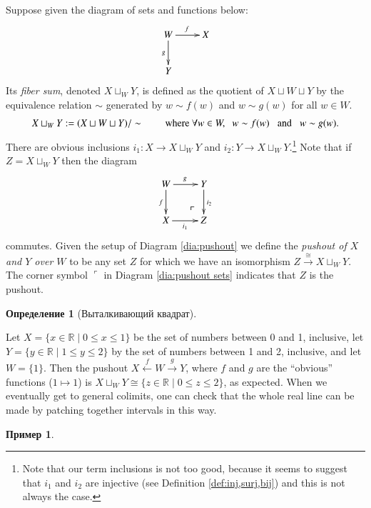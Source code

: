 \documentclass[a4paper]{book}
\makeatletter
\def\tn{\textnormal}
\def\RR{{\mathbb R}}
\def\hsp{\hspace{.3in}}
\def\to{\rightarrow}
\def\taking{\colon}
\def\iso{\cong}
\def\|{{\;|\;}}
\def\lrlimit{\ar@{}[lu]|(.3)*+{\ulcorner}}
\newcommand{\To}[1]{\xrightarrow{#1}}
\newcommand{\From}[1]{\xleftarrow{#1}}
\theoremstyle{myth}
\newtheorem{exampleENG}[envENG]{\begin{english}Example\end{english}}
\newtheorem{definitionENG}[envENG]{\begin{english}Definition\end{english}}
\newtheorem{exampleRUS}[envRUS]{Пример}
\newtheorem{definitionRUS}[envRUS]{Определение}
\makeatother
\begin{document}
\begin{russian}
\begin{definitionENG}[Pushout]\label{def:pushout}
Suppose given the diagram of sets and functions below:
\begin{align}\label{dia:pushout}
\xymatrix{W\ar[r]^f\ar[d]_g&X\\Y}
\end{align}
Its {\em fiber sum}, denoted $X\sqcup_WY$, is defined as the quotient of $X\sqcup W\sqcup Y$ by the equivalence relation $\sim$ generated by $w\sim f(w)$ and $w\sim g(w)$ for all $w\in W$.
$$X\sqcup_WY:=(X\sqcup W\sqcup Y)/\sim \hsp\tn{where } \forall w\in W,\;\;  w\sim f(w)\;\;\tn{ and }\;\; w\sim g(w).$$ 
There are obvious inclusions $i_1\taking X\to X\sqcup_WY$ and $i_2\taking Y\to X\sqcup_WY$.\footnote{Note that our term inclusions is not too good, because it seems to suggest that $i_1$ and $i_2$ are injective (see Definition \ref{def:inj,surj,bij}) and this is not always the case.}
Note that if $Z=X\sqcup_WY$ then the diagram
\begin{align}\label{dia:pushout sets}
\xymatrix{W\ar[r]^g\ar[d]_f&Y\ar[d]^{i_2}\\X\ar[r]_-{i_1}&Z\lrlimit}
\end{align} 
commutes. Given the setup of Diagram \ref{dia:pushout} we define the {\em pushout of $X$ and $Y$ over $W$} to be any set $Z$ for which we have an isomorphism $Z\To{\iso}X\sqcup_WY$. The corner symbol $\ulcorner$ in Diagram \ref{dia:pushout sets} indicates that $Z$ is the pushout.
\end{definitionENG}

\begin{definitionRUS}[Выталкивающий квадрат]\label{def:pushout}
 
\end{definitionRUS}

\begin{exampleENG}
Let $X=\{x\in\RR\|0\leq x\leq1\}$ be the set of numbers between 0 and 1, inclusive, let $Y=\{y\in\RR\|1\leq y\leq 2\}$ by the set of numbers between 1 and 2, inclusive, and let $W=\{1\}$. Then the pushout $X\From{f} W\To{g} Y$, where $f$ and $g$ are the “obvious” functions ($1\mapsto 1$) is $X\sqcup_WY\iso\{z\in\RR\|0\leq z\leq 2\}$, as expected. When we eventually get to general colimits, one can check that the whole real line can be made by patching together intervals in this way.
\end{exampleENG}

\begin{exampleRUS}
 

\end{exampleRUS}
\end{russian}
\end{document}
